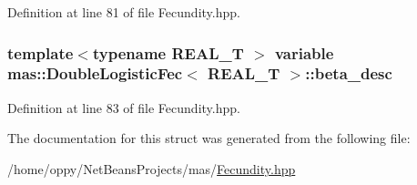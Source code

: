Definition at line 81 of file Fecundity.\-hpp.

\hypertarget{structmas_1_1_double_logistic_fec_a34f906fdd181ef464af015fa8b95432d}{
\subsubsection[{beta\-\_\-desc}]{\setlength{\rightskip}{0pt plus 5cm}template$<$typename R\-E\-A\-L\-\_\-\-T $>$ {\bf variable} {\bf mas\-::\-Double\-Logistic\-Fec}$<$ R\-E\-A\-L\-\_\-\-T $>$\-::beta\-\_\-desc}}\label{structmas_1_1_double_logistic_fec_a34f906fdd181ef464af015fa8b95432d}


Definition at line 83 of file Fecundity.\-hpp.



The documentation for this struct was generated from the following file\-:\begin{DoxyCompactItemize}
\item 
/home/oppy/\-Net\-Beans\-Projects/mas/\hyperlink{_fecundity_8hpp}{Fecundity.\-hpp}\end{DoxyCompactItemize}
